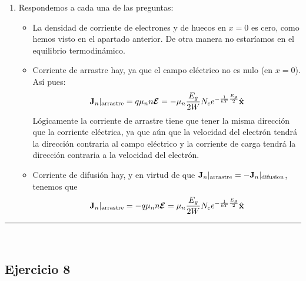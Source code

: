 \begin{enumerate}[label=\alph*)]
	\item Respondemos a cada una de las preguntas:
	\begin{itemize}
		\item La densidad de corriente de electrones y de huecos en $x=0$ es cero, como hemos visto en el apartado anterior. De otra manera no estaríamos en el equilibrio termodinámico.
		\item Corriente de arrastre hay, ya que el campo eléctrico no es nulo (en $x=0$). Así pues: 
		\begin{equation}
			\mathbf{J}_n |_{\text{arrastre}} = q \mu_n n \boldsymbol{\mathcal{E}} =  - \mu_n \frac{E_g}{2W} N_c  e^{-\frac{1}{kT}\frac{E_g}{2}}  \hat{\mathbf{x}} 
		\end{equation}
		Lógicamente la corriente de arrastre tiene que tener la misma dirección que la corriente eléctrica, ya que aún que la velocidad del electrón tendrá la dirección contraria al campo eléctrico y la corriente de carga tendrá la dirección contraria a la velocidad del electrón. 
		\item Corriente de difusión hay, y en virtud de que $\mathbf{J}_n|_{\text{arrastre}}=- \mathbf{J}_n|_{\text{difusion}}$, tenemos que
		\begin{equation}
			\mathbf{J}_n |_{\text{arrastre}} = - q \mu_n n \boldsymbol{\mathcal{E}} =  \mu_n \frac{E_g}{2W} N_c  e^{-\frac{1}{kT}\frac{E_g}{2}}  \hat{\mathbf{x}} 
		\end{equation}
	\end{itemize}
\end{enumerate}


\rule{\textwidth}{0.1pt} \\[2pt]

\subsection{Ejercicio 8}

